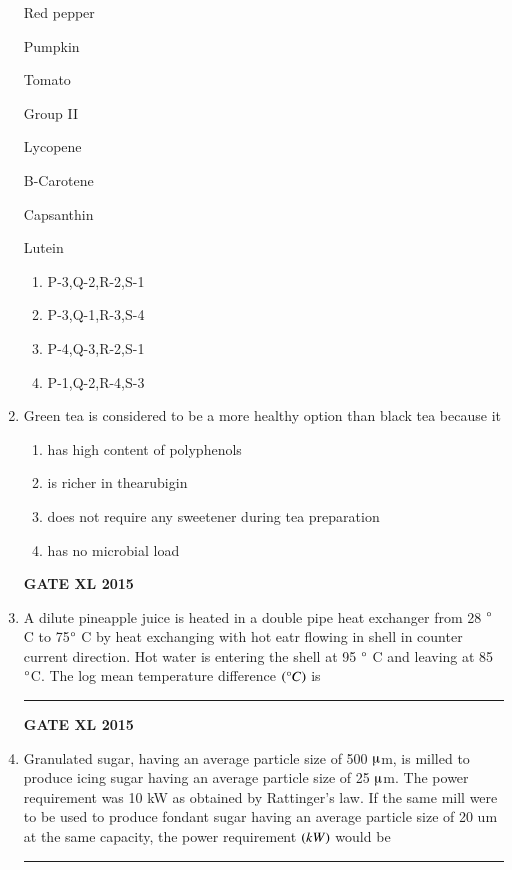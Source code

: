 \documentclass[journal,12pt,onecolumn]{IEEEtran}
\begin{document}
\begin{enumerate}
\begin{minipage}{0.5\textwidth}
\begin{flushleft}
 Red pepper

 Pumpkin

 Tomato 
	\end{flushleft}
	\end{minipage}
	\begin{minipage}{0.5\textwidth}\begin{flushleft}
Group II

 Lycopene

 B-Carotene

 Capsanthin

 Lutein
	\end{flushleft}
	\end{minipage}
    \begin{enumerate}
            \item P-3,Q-2,R-2,S-1
            \item P-3,Q-1,R-3,S-4
            \item P-4,Q-3,R-2,S-1
            \item P-1,Q-2,R-4,S-3
    \end{enumerate}
\item  Green tea is considered to be a more healthy option than black tea because it
    \begin{enumerate}
            \item  has high content of polyphenols
	    \item is richer in thearubigin
	    \item {does not require any sweetener during tea preparation}
	    \item {has no microbial load}
    \end{enumerate}
\hfill{\textbf{GATE XL 2015}}
\item  A dilute pineapple juice is heated in a double pipe heat exchanger from 28 $\degree$ C to 75$\degree$ C by heat exchanging with hot eatr flowing in shell in counter current direction. Hot water is entering the shell at 95 $\degree$ C and leaving at 85 $\degree$C. The log mean temperature difference $\left(\degree C\right)$ is \rule{1cm}{0.15mm}
\hfill{\textbf{GATE XL 2015}}
\item  Granulated sugar, having an average particle size of 500 $\micro$m, is milled to produce icing sugar having an average particle size of 25 $\micro$m. The power requirement was 10 kW as obtained by Rattinger's law. If the same mill were to be used to produce fondant sugar having an average particle size of 20 um at the same capacity, the power requirement $\left(kW\right)$ would be \rule{1cm}{0.15mm}
    

\end{enumerate}
\end{document}
